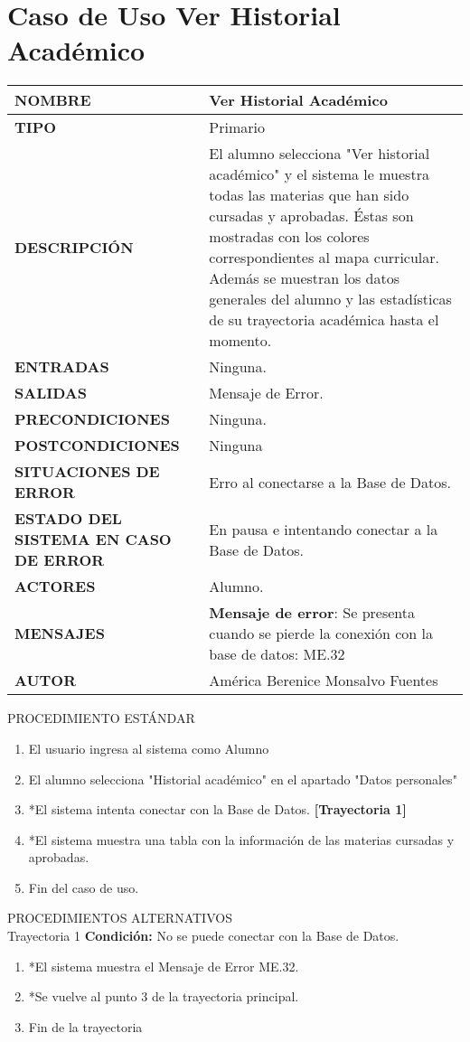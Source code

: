 \newpage
\section{Caso de Uso Ver Historial Académico}
\begin{longtable}{ | p{6cm} | p{10cm} |}
	\hline
	\textbf{NOMBRE} & Ver Historial Académico\\
	\hline
	\textbf{TIPO} & Primario\\
	\hline
	\textbf{DESCRIPCIÓN}
	&
	El alumno selecciona  "Ver historial académico" y el sistema le muestra todas las materias que han sido cursadas y aprobadas. Éstas son mostradas con los colores correspondientes al mapa curricular. Además se muestran los datos generales del alumno y las estadísticas de su trayectoria académica hasta el momento.\\
	\hline
	\textbf{ENTRADAS} & Ninguna.\\
	\hline
	\textbf{SALIDAS} & Mensaje de Error.\\
	\hline
	\textbf{PRECONDICIONES} & Ninguna.\\
	\hline
	\textbf{POSTCONDICIONES} & Ninguna\\
	\hline
	\textbf{SITUACIONES DE ERROR} & Erro al conectarse a la Base de Datos.\\
	\hline
	\textbf{ESTADO DEL SISTEMA EN CASO DE ERROR} & En pausa e intentando conectar a la Base de Datos.\\
	\hline
	\textbf{ACTORES} & Alumno.\\
	\hline
	\textbf{MENSAJES} & \textbf{Mensaje de error}: Se presenta cuando se pierde la conexión con la base de datos: ME.32\\
	\hline
	\textbf{AUTOR} & América Berenice Monsalvo Fuentes\\
	\hline
\end{longtable}
\Large{PROCEDIMIENTO ESTÁNDAR}
\large{}
\begin{enumerate}
	\item El usuario ingresa al sistema como Alumno
	\item El alumno selecciona "Historial académico" en el apartado "Datos personales"
	\item *El sistema intenta conectar con la Base de Datos. \textbf{[Trayectoria 1]}
	\item *El sistema muestra una tabla con la información de las materias cursadas y aprobadas.
	\item Fin del caso de uso.
\end{enumerate}
\vspace*{1cm}
\Large{PROCEDIMIENTOS ALTERNATIVOS}\\
\large{Trayectoria 1}
\textbf{Condición:} No se puede conectar con la Base de Datos.
\begin{enumerate}
	\item *El sistema muestra el Mensaje de Error ME.32.
	\item *Se vuelve al punto 3 de la trayectoria principal.
	\item Fin de la trayectoria
\end{enumerate}

